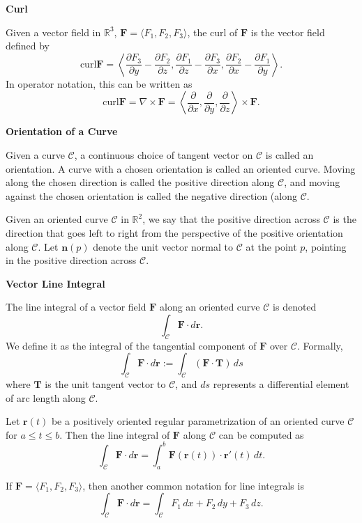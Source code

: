 \documentclass{article}
\newcommand{\R}{\mathbb{R}}
\newenvironment{definition}[1]{
    \par\noindent\textbf{#1}\par\noindent
}{
    \par \vspace{0.5cm}
}
\begin{document}
\begin{definition}{Curl}
Given a vector field in \(\R^3\), \(\bm{F} = \langle F_1, F_2, F_3 \rangle\), the curl of \(\bm{F}\) is the vector field defined by
\[ \text{curl}\bm{F} = \left\langle \frac{\partial F_3}{\partial y} - \frac{\partial F_2}{\partial z}, \frac{\partial F_1}{\partial z} - \frac{\partial F_3}{\partial x}, \frac{\partial F_2}{\partial x} - \frac{\partial F_1}{\partial y} \right\rangle. \]
In operator notation, this can be written as
\[ \text{curl}\bm{F} = \nabla \times \bm{F} = \left\langle \frac{\partial}{\partial x}, \frac{\partial}{\partial y}, \frac{\partial}{\partial z} \right\rangle \times \bm{F}. \]
\end{definition}

\begin{definition}{Orientation of a Curve}
Given a curve \(\mathcal{C}\), a continuous choice of tangent vector on \(\mathcal{C}\) is called an orientation. A curve with a chosen orientation is called an oriented curve. Moving along the chosen direction is called the positive direction along \(\mathcal{C}\), and moving against the chosen orientation is called the negative direction (along \(\mathcal{C}\).

Given an oriented curve \(\mathcal{C}\) in \(\R^2\), we say that the positive direction across \(\mathcal{C}\) is the direction that goes left to right from the perspective of the positive orientation along \(\mathcal{C}\). Let \(\bm{n}(p)\) denote the unit vector normal to \(\mathcal{C}\) at the point \(p\), pointing in the positive direction across \(\mathcal{C}\).
\end{definition}



\begin{definition}{Vector Line Integral}
The line integral of a vector field \(\bm{F}\) along an oriented curve \(\mathcal{C}\) is denoted
\[ \int_{\mathcal{C}} \bm{F} \cdot d\bm{r}. \]
We define it as the integral of the tangential component of \(\bm{F}\) over \(\mathcal{C}\). Formally,
\[ \int_{\mathcal{C}} \bm{F} \cdot d\bm{r} := \int_{\mathcal{C}} (\bm{F} \cdot \bm{T}) \, ds \]
where \(\bm{T}\) is the unit tangent vector to \(\mathcal{C}\), and \(ds\) represents a differential element of arc length along \(\mathcal{C}\).

Let \(\bm{r}(t)\) be a positively oriented regular parametrization of an oriented curve \(\mathcal{C}\) for \(a \leq t \leq b\). Then the line integral of \(\bm{F}\) along \(\mathcal{C}\) can be computed as
\[ \int_{\mathcal{C}} \bm{F} \cdot d\bm{r} = \int_a^b \bm{F}(\bm{r}(t)) \cdot \bm{r}'(t) \, dt. \]

If \(\bm{F} = \langle F_1, F_2, F_3 \rangle\), then another common notation for line integrals is
\[ \int_{\mathcal{C}} \bm{F} \cdot d\bm{r} = \int_{\mathcal{C}} F_1 \, dx + F_2 \, dy + F_3 \, dz. \]
\end{definition}
\end{document}
